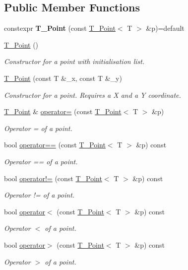 \subsection*{Public Member Functions}
\begin{DoxyCompactItemize}
\item 
\mbox{\label{classPoint_a46b19075d2bb9592f4a8ac310b1fe29d}} 
constexpr {\bfseries T_Point} (const \hyperlink{classPoint}{T_Point}$<$ T $>$ \&p)=default
\item 
\mbox{\label{classPoint_aea76b1130f1a203722d8f2254ced8e66}} 
\hyperlink{classPoint_aea76b1130f1a203722d8f2254ced8e66}{T_Point} ()
\begin{DoxyCompactList}\small\item\em Constructor for a point with initialisation list. \end{DoxyCompactList}\item 
\hyperlink{classPoint_a0a84c3f55d42ec6e142de0251ea255ad}{T_Point} (const T \&\+\_\+x, const T \&\+\_\+y)
\begin{DoxyCompactList}\small\item\em Constructor for a point. Requires a X and a Y coordinate. \end{DoxyCompactList}\item 
\hyperlink{classPoint}{T_Point} \& \hyperlink{classPoint_a2e9aa15e5410f48937c9d474262dab3e}{operator=} (const \hyperlink{classPoint}{T_Point}$<$ T $>$ \&p)
\begin{DoxyCompactList}\small\item\em Operator = of a point. \end{DoxyCompactList}\item 
bool \hyperlink{classPoint_aaaaac8f25a60bca6ae5ddbb34fd3e9d8}{operator==} (const \hyperlink{classPoint}{T_Point}$<$ T $>$ \&p) const
\begin{DoxyCompactList}\small\item\em Operator == of a point. \end{DoxyCompactList}\item 
bool \hyperlink{classPoint_ac0b85ea22cdadeed30c4a8db0cfc76f9}{operator!=} (const \hyperlink{classPoint}{T_Point}$<$ T $>$ \&p) const
\begin{DoxyCompactList}\small\item\em Operator != of a point. \end{DoxyCompactList}\item 
bool \hyperlink{classPoint_a4871508a56f646b8e95cd11257ea093e}{operator$<$} (const \hyperlink{classPoint}{T_Point}$<$ T $>$ \&p) const
\begin{DoxyCompactList}\small\item\em Operator $<$ of a point. \end{DoxyCompactList}\item 
bool \hyperlink{classPoint_acc5ef36d8fd82f6034ec4764f7c7cbf8}{operator$>$} (const \hyperlink{classPoint}{T_Point}$<$ T $>$ \&p) const
\begin{DoxyCompactList}\small\item\em Operator $>$ of a point. \end{DoxyCompactList}\end{DoxyCompactItemize}
